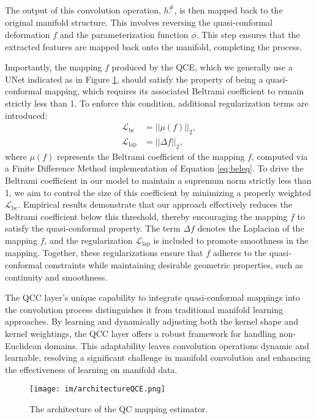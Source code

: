 The output of this convolution operation, $ h^\#_\prime $, is then mapped back to the original manifold structure. This involves reversing the quasi-conformal deformation $ f $ and the parameterization function $ \phi $. This step ensures that the extracted features are mapped back onto the manifold, completing the process.

Importantly, the mapping $ f $ produced by the QCE, which we generally use a UNet indicated as in Figure \ref{fig:QCE}, should satisfy the property of being a quasi-conformal mapping, which requires its associated Beltrami coefficient to remain strictly less than 1. To enforce this condition, additional regularization terms are introduced:  
\begin{equation}\label{eq:losses}
\begin{aligned}
    \mathcal{L}_{\text{bc}} &= ||\mu(f)||_2, \\
    \mathcal{L}_{\text{lap}} &= ||\Delta f||_2,
\end{aligned}
\end{equation}
where $ \mu(f) $ represents the Beltrami coefficient of the mapping $ f $, computed via a Finite Difference Method implementation of Equation \eqref{eq:beleq}. 
To drive the Beltrami coefficient in our model to maintain a supremum norm strictly less than 1, we aim to control the size of this coefficient by minimizing a properly weighted $ \mathcal{L}_{\text{bc}} $. Empirical results demonstrate that our approach effectively reduces the Beltrami coefficient below this threshold, thereby encouraging the mapping $f$ to satisfy the quasi-conformal property. The term $ \Delta f $ denotes the Laplacian of the mapping $ f $, and the regularization $ \mathcal{L}_{\text{lap}} $ is included to promote smoothness in the mapping. Together, these regularizations ensure that $ f $ adheres to the quasi-conformal constraints while maintaining desirable geometric properties, such as continuity and smoothness.

The QCC layer's unique capability to integrate quasi-conformal mappings into the convolution process distinguishes it from traditional manifold learning approaches. By learning and dynamically adjusting both the kernel shape and kernel weightings, the QCC layer offers a robust framework for handling non-Euclidean domains. This adaptability leaves convolution operations dynamic and learnable, resolving a significant challenge in manifold convolution and enhancing the effectiveness of learning on manifold data.


\begin{figure}
    \centering
    \texttt{[image: im/architectureQCE.png]}
    \caption{The architecture of the QC mapping estimator.}
    \label{fig:QCE}
\end{figure}




